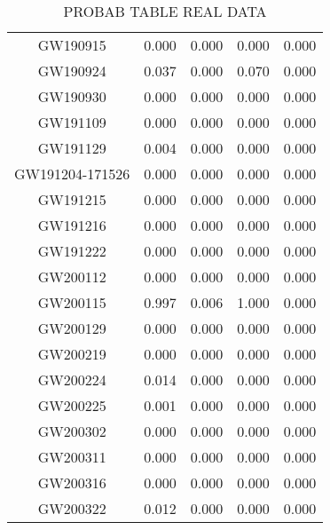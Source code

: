 \begin{table}[]
\begin{tabular}{ccccc}
GW190915 &  0.000 &	0.000 &	0.000 &	0.000 \\
GW190924 &  0.037  & 0.000 &	0.070 &	0.000 \\
GW190930 &	0.000 &	 0.000 &	0.000 &	0.000 \\ 
GW191109 &	0.000 &	0.000 &	0.000 & 0.000 \\
GW191129 & 0.004 & 	0.000 &	0.000 & 0.000 \\
GW191204-171526 & 0.000 &	0.000	& 0.000 &	0.000 \\
GW191215 & 0.000 &	0.000 &	0.000 &	0.000 \\
GW191216 & 0.000 &	0.000 &	0.000 & 0.000 \\
GW191222 & 0.000 &	0.000 &	0.000 & 0.000 \\
GW200112 & 0.000 &	0.000 &	0.000 & 	0.000 \\
GW200115 &	0.997 &	0.006 &	1.000 &	0.000 \\
GW200129 & 0.000 &	0.000 &	0.000 &	0.000 \\
GW200219 & 0.000 &	0.000 &	0.000 	& 0.000 \\
GW200224 & 0.014 &	0.000 &	0.000 & 0.000 \\
GW200225 &  0.001 &	0.000 &	0.000 &	0.000 \\ 
GW200302   & 0.000 &	0.000 &	0.000 & 0.000 \\
GW200311 &	0.000 &	0.000 & 0.000 & 0.000 \\   
GW200316 & 0.000 &	0.000 &	0.000 & 0.000 \\
GW200322 & 0.012 &	0.000 &	0.000 &	0.000 \\


\hline
\end{tabular}
\caption{PROBAB TABLE REAL DATA}
\label{tab:real_data}
\end{table}
